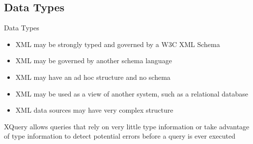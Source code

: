 \documentclass[sans]{beamer}
\begin{document}




\subsection{Data Types}

\begin{frame}{Data Types}
	\begin{itemize}
		\item XML may be strongly typed and governed by a W3C XML Schema
		\item XML may be governed by another schema language
		\item XML may have an ad hoc structure and no schema
		\item XML may be used as a view of another system, such as a relational database
		\item XML data sources may have very complex structure
	\end{itemize}

	\begin{block}{}
		XQuery allows queries that rely on very little type information or take advantage of type information to detect potential errors before a query is ever executed
	\end{block}

\end{frame}

\end{document}
